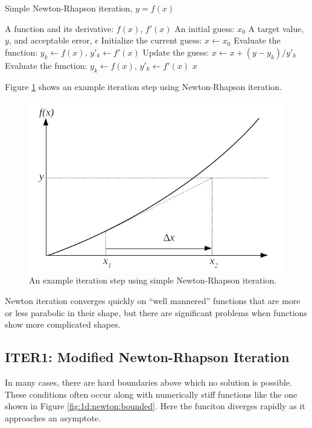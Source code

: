 \documentclass{article}
\begin{document}
\begin{algorithm}
\caption{Simple Newton-Rhapson iteration, $y = f(x)$}\label{alg:1d:newton}
\begin{algorithmic}
\REQUIRE A function and its derivative: $f(x)$, $f'(x)$
\REQUIRE An initial guess: $x_0$
\REQUIRE A target value, $y$, and acceptable error, $\epsilon$
\STATE Initialize the current guess: $x \leftarrow x_0$
\STATE Evaluate the function: $y_k \leftarrow f(x)$, $y'_k \leftarrow f'(x)$
\STATE Update the guess: $x \leftarrow x + (y - y_k)/y'_k$
\STATE Evaluate the function: $y_k \leftarrow f(x)$, $y'_k \leftarrow f'(x)$
\ENDWHILE
\RETURN $x$
\end{algorithmic}
\end{algorithm}

Figure \ref{fig:1d:newton} shows an example iteration step using Newton-Rhapson iteration.

\begin{figure}
\centering
\includegraphics[width=0.8\linewidth]{figures/1d_newton}
\caption{An example iteration step using simple Newton-Rhapson iteration.}\label{fig:1d:newton}
\end{figure}

Newton iteration converges quickly on ``well mannered'' functions that are more or less parabolic in their shape, but there are significant problems when functions show more complicated shapes.

\subsection{ITER1: Modified Newton-Rhapson Iteration}

In many cases, there are hard boundaries above which no solution is possible.  These conditions often occur along with numerically stiff functions like the one shown in Figure \ref{fig:1d:newton:bounded}.  Here the funciton diverges rapidly as it approaches an asymptote.
\end{document}

